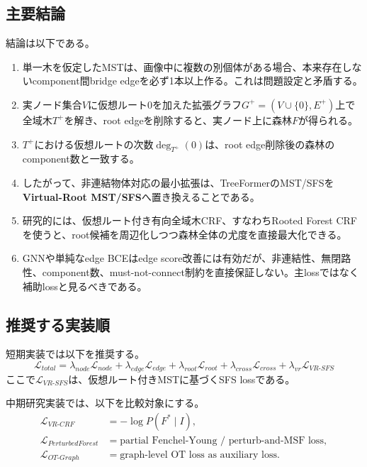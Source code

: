 \documentclass[11pt,a4paper]{article}
\begin{document}
\subsection{主要結論}
結論は以下である。
\begin{enumerate}
  \item 単一木を仮定したMSTは、画像中に複数の別個体がある場合、本来存在しないcomponent間bridge edgeを必ず1本以上作る。これは問題設定と矛盾する。
  \item 実ノード集合$V$に仮想ルート$0$を加えた拡張グラフ$G^+=(V\cup\{0\},E^+)$上で全域木$T^+$を解き、root edgeを削除すると、実ノード上に森林$F$が得られる。
  \item $T^+$における仮想ルートの次数$\deg_{T^+}(0)$は、root edge削除後の森林のcomponent数と一致する。
  \item したがって、非連結物体対応の最小拡張は、TreeFormerのMST/SFSを\textbf{Virtual-Root MST/SFS}へ置き換えることである。
  \item 研究的には、仮想ルート付き有向全域木CRF、すなわちRooted Forest CRFを使うと、root候補を周辺化しつつ森林全体の尤度を直接最大化できる。
  \item GNNや単純なedge BCEはedge score改善には有効だが、非連結性、無閉路性、component数、must-not-connect制約を直接保証しない。主lossではなく補助lossと見るべきである。
\end{enumerate}

\subsection{推奨する実装順}
短期実装では以下を推奨する。
\begin{equation}
\boxed{
\mathcal{L}_{total}
=\lambda_{node}\mathcal{L}_{node}
+\lambda_{edge}\mathcal{L}_{edge}
+\lambda_{root}\mathcal{L}_{root}
+\lambda_{cross}\mathcal{L}_{cross}
+\lambda_{vr}\mathcal{L}_{VR\text{-}SFS}
}
\label{eq:recommended_loss}
\end{equation}
ここで$\mathcal{L}_{VR\text{-}SFS}$は、仮想ルート付きMSTに基づくSFS lossである。

中期研究実装では、以下を比較対象にする。
\begin{align}
  \mathcal{L}_{VR\text{-}CRF}
  &= -\log P(F^*\mid I), \\
  \mathcal{L}_{PerturbedForest}
  &= \text{partial Fenchel-Young / perturb-and-MSF loss}, \\
  \mathcal{L}_{OT\text{-}Graph}
  &= \text{graph-level OT loss as auxiliary loss}.
\end{align}
\end{document}
